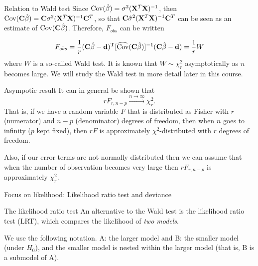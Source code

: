 \documentclass[
  ignorenonframetext,
]{beamer}
\begin{document}
\begin{frame}
\begin{block}{Relation to Wald test}
\label{relation-to-wald-test}
Since \(\text{Cov}(\hat{\beta})=\sigma^2 ({\bf X}^T{\bf X})^{-1}\), then
\(\text{Cov}({\bf C}\hat{\beta})={\bf C}\sigma^2({\bf X}^T{\bf X})^{-1}{\bf C}^T\),
so that \({\bf C}\hat{\sigma}^2({\bf X}^T{\bf X})^{-1}{\bf C}^T\) can be
seen as an estimate of \(\text{Cov}({\bf C}\hat{\beta})\). Therefore,
\(F_{obs}\) can be written

\[F_{obs}=\frac{1}{r}({\bf C}\hat{{\bf \beta}}-{\bf d})^{\text T}[\widehat{\text{Cov}}({\bf C}\hat{\beta})]^{-1}({\bf C}\hat{{\bf \beta}}-{\bf d})=\frac{1}{r}W\]
where \(W\) is a so-called Wald test. It is known that
\(W\sim \chi^2_r\) asymptotically as \(n\) becomes large. We will study
the Wald test in more detail later in this course.
\end{block}
\end{frame}

\begin{frame}
\begin{block}{Asympotic result}
\label{asympotic-result}
It can in general be shown that
\[r F_{r,n-p}\stackrel{n\rightarrow \infty}{\longrightarrow} \chi^2_r.\]
That is, if we have a random variable \(F\) that is distributed as
Fisher with \(r\) (numerator) and \(n-p\) (denominator) degrees of
freedom, then when \(n\) goes to infinity (\(p\) kept fixed), then
\(rF\) is approximately \(\chi^2\)-distributed with \(r\) degrees of
freedom.

Also, if our error terms are not normally distributed then we can assume
that when the number of observation becomes very large then
\(rF_{r,n-p}\) is approximately \(\chi^2_r\).
\end{block}
\end{frame}

\begin{frame}{Focus on likelihood: Likelihood ratio test and deviance}
\label{focus-on-likelihood-likelihood-ratio-test-and-deviance}
\begin{block}{The likelihood ratio test}
\label{the-likelihood-ratio-test}
An alternative to the Wald test is the likelihood ratio test (LRT),
which compares the likelihood of \emph{two models}.

We use the following notation. A: the larger model and B: the smaller
model (under \(H_0\)), and the smaller model is nested within the larger
model (that is, B is a submodel of A).
\end{block}
\end{frame}
\end{document}
